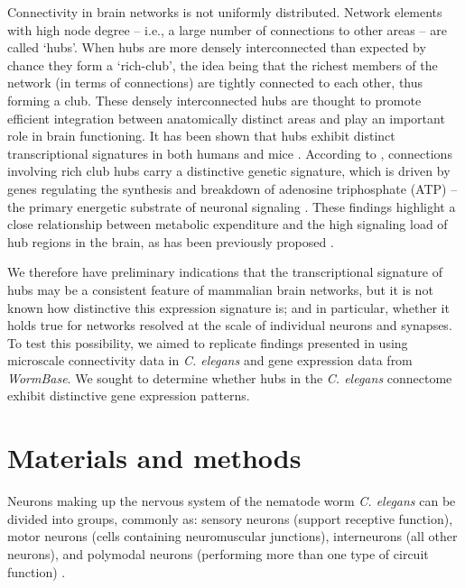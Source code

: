 \documentclass[10pt,letterpaper]{article}
\begin{document}
Connectivity in brain networks is not uniformly distributed. Network elements with high node degree – i.e., a large number of connections to other areas – are called `hubs'.
When hubs are more densely interconnected than expected by chance they form a `rich-club', the idea being that the richest members of the network (in terms of connections) are tightly connected to each other, thus forming a club.
These densely interconnected hubs are thought to promote efficient integration between anatomically distinct areas and play an important role in brain functioning.
It has been shown that hubs exhibit distinct transcriptional signatures in both humans \cite{Vertes2016a} and mice \cite{Fulcher2016}.
According to \citet{Fulcher2016}, connections involving rich club hubs carry a distinctive genetic signature, which is driven by genes regulating the synthesis and breakdown of adenosine triphosphate (ATP) – the primary energetic substrate of neuronal signaling \cite{Fulcher2016}.
These findings highlight a close relationship between metabolic expenditure and the high signaling load of hub regions in the brain, as has been previously proposed \cite{Bullmore2012}.


We therefore have preliminary indications that the transcriptional signature of hubs may be a consistent feature of mammalian brain networks, but it is not known how distinctive this expression signature is; and in particular, whether it holds true for networks resolved at the scale of individual neurons and synapses.
To test this possibility, we aimed to replicate findings presented in \cite{Fulcher2016} using microscale connectivity data in \emph{C. elegans} and gene expression data from \emph{WormBase}.
We sought to determine whether hubs in the \emph{C. elegans} connectome exhibit distinctive gene expression patterns.


\section*{Materials and methods}

Neurons making up the nervous system of the nematode worm \emph{C. elegans} can be divided into groups, commonly as: sensory neurons (support receptive function), motor neurons (cells containing neuromuscular junctions), interneurons (all other neurons), and polymodal neurons (performing more than one type of circuit function) \cite{White:1986tx}.
\end{document}
